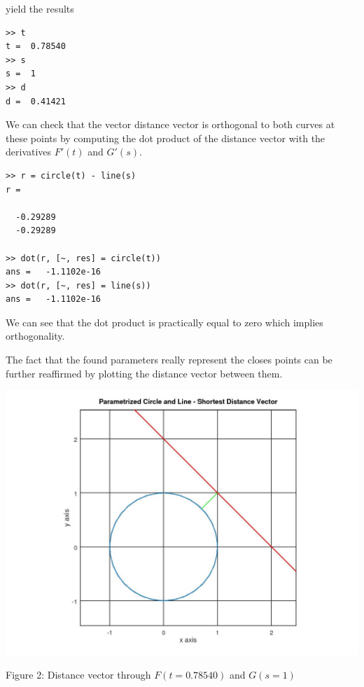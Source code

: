 \documentclass[A4]{article}
\begin{document}
yield the results

\begin{tcolorbox}
	\begin{small}
	\begin{verbatim}
>> t
t =  0.78540
>> s
s =  1
>> d
d =  0.41421
	\end{verbatim}
	\end{small}
\end{tcolorbox}

We can check that the vector distance vector is orthogonal to both curves at these points by computing the dot product of the distance vector with the derivatives $F'(t)$ and $G'(s)$.

\begin{tcolorbox}
	\begin{small}
	\begin{verbatim}
>> r = circle(t) - line(s)
r =

  -0.29289
  -0.29289

>> dot(r, [~, res] = circle(t))
ans =   -1.1102e-16
>> dot(r, [~, res] = line(s))
ans =   -1.1102e-16
	\end{verbatim}
	\end{small}
\end{tcolorbox}

We can see that the dot product is practically equal to zero which implies orthogonality.

The fact that the found parameters really represent the closes points can be further reaffirmed by plotting the distance vector between them.
\vspace{5mm}

\includegraphics[scale=0.5, inner]{2}
\begin{center}
	\caption{Figure 2: Distance vector through $F(t=0.78540)$ and $G(s=1)$}
\end{center}
\end{document}
